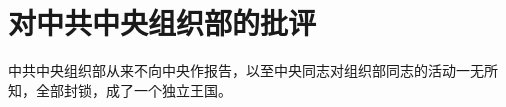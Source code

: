 \section[对中共中央组织部的批评（一九六二年八月十二日）]{对中共中央组织部的批评}


中共中央组织部从来不向中央作报告，以至中央同志对组织部同志的活动一无所知，全部封锁，成了一个独立王国。

